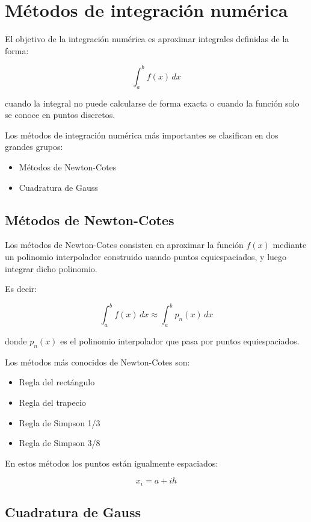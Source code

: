 \documentclass[12pt,a4paper]{article}
\begin{document}
\section{Métodos de integración numérica}

El objetivo de la integración numérica es aproximar integrales definidas de la forma:

\[
\int_a^b f(x)\,dx
\]

cuando la integral no puede calcularse de forma exacta o cuando la función solo se conoce en puntos discretos.

Los métodos de integración numérica más importantes se clasifican en dos grandes grupos:

\begin{itemize}
\item Métodos de Newton-Cotes
\item Cuadratura de Gauss
\end{itemize}

\subsection{Métodos de Newton-Cotes}

Los métodos de Newton-Cotes consisten en aproximar la función $f(x)$ mediante un 
polinomio interpolador construido usando puntos equiespaciados, y luego integrar
dicho polinomio.

Es decir:

\[
\int_a^b f(x)\,dx \approx \int_a^b p_n(x)\,dx
\]

donde $p_n(x)$ es el polinomio interpolador que pasa por puntos equiespaciados.

Los métodos más conocidos de Newton-Cotes son:

\begin{itemize}
\item Regla del rectángulo
\item Regla del trapecio
\item Regla de Simpson 1/3
\item Regla de Simpson 3/8
\end{itemize}

En estos métodos los puntos están igualmente espaciados:

\[
x_i = a + ih
\]

\subsection{Cuadratura de Gauss}
\end{document}
